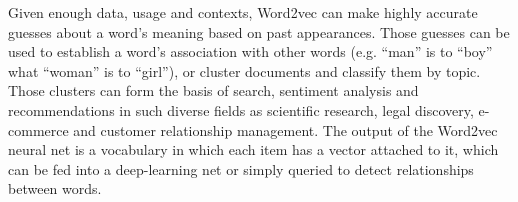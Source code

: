 Given enough data, usage and contexts, Word2vec can make highly accurate guesses about a word’s meaning based on past appearances. Those guesses can be used to establish a word’s association with other words (e.g. “man” is to “boy” what “woman” is to “girl”), or cluster documents and classify them by topic. Those clusters can form the basis of search, sentiment analysis and recommendations in such diverse fields as scientific research, legal discovery, e-commerce and customer relationship management. The output of the Word2vec neural net is a vocabulary in which each item has a vector attached to it, which can be fed into a deep-learning net or simply queried to detect relationships between words.
